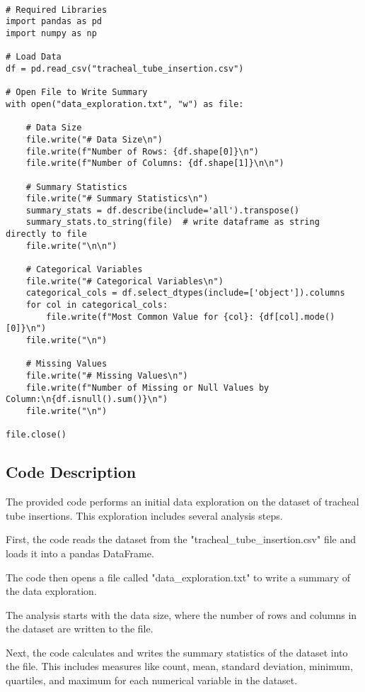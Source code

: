 \documentclass[11pt]{article}
\begin{document}
\begin{verbatim}

# Required Libraries
import pandas as pd
import numpy as np

# Load Data
df = pd.read_csv("tracheal_tube_insertion.csv")

# Open File to Write Summary
with open("data_exploration.txt", "w") as file:

    # Data Size
    file.write("# Data Size\n")
    file.write(f"Number of Rows: {df.shape[0]}\n")
    file.write(f"Number of Columns: {df.shape[1]}\n\n")

    # Summary Statistics
    file.write("# Summary Statistics\n")
    summary_stats = df.describe(include='all').transpose()
    summary_stats.to_string(file)  # write dataframe as string directly to file
    file.write("\n\n")

    # Categorical Variables
    file.write("# Categorical Variables\n")
    categorical_cols = df.select_dtypes(include=['object']).columns
    for col in categorical_cols:
        file.write(f"Most Common Value for {col}: {df[col].mode()[0]}\n")
    file.write("\n")

    # Missing Values
    file.write("# Missing Values\n")
    file.write(f"Number of Missing or Null Values by Column:\n{df.isnull().sum()}\n")
    file.write("\n")
    
file.close()

\end{verbatim}

\subsection{Code Description}

The provided code performs an initial data exploration on the dataset of tracheal tube insertions. This exploration includes several analysis steps.

First, the code reads the dataset from the "tracheal\_tube\_insertion.csv" file and loads it into a pandas DataFrame. 

The code then opens a file called "data\_exploration.txt" to write a summary of the data exploration. 

The analysis starts with the data size, where the number of rows and columns in the dataset are written to the file. 

Next, the code calculates and writes the summary statistics of the dataset into the file. This includes measures like count, mean, standard deviation, minimum, quartiles, and maximum for each numerical variable in the dataset. 
\end{document}
